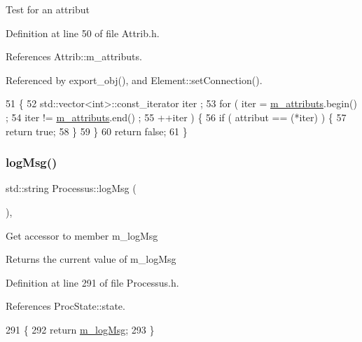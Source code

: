 Test for an attribut 

Definition at line 50 of file Attrib.\+h.



References Attrib\+::m\+\_\+attributs.



Referenced by export\+\_\+obj(), and Element\+::set\+Connection().


\begin{DoxyCode}
51   \{
52     std::vector<int>::const\_iterator iter ;
53     \textcolor{keywordflow}{for} ( iter  = \hyperlink{classAttrib_ac4bd58a0cc6b38a3b711d609a3d3aacc}{m\_attributs}.begin() ;
54           iter != \hyperlink{classAttrib_ac4bd58a0cc6b38a3b711d609a3d3aacc}{m\_attributs}.end()   ;
55           ++iter ) \{
56       \textcolor{keywordflow}{if} ( attribut == (*iter) ) \{
57         \textcolor{keywordflow}{return} \textcolor{keyword}{true};
58       \}
59     \}
60     \textcolor{keywordflow}{return} \textcolor{keyword}{false};
61   \}
\end{DoxyCode}
\mbox{\label{classProcessus_a42fdeb17dc13ba854222666b6aa29b61}} 
\subsubsection{\texorpdfstring{log\+Msg()}{logMsg()}}
{\footnotesize\ttfamily std\+::string Processus\+::log\+Msg (\begin{DoxyParamCaption}{ }\end{DoxyParamCaption})\hspace{0.3cm}{\ttfamily [inline]}, {\ttfamily [inherited]}}

Get accessor to member m\+\_\+log\+Msg \begin{DoxyReturn}{Returns}
the current value of m\+\_\+log\+Msg 
\end{DoxyReturn}


Definition at line 291 of file Processus.\+h.



References Proc\+State\+::state.


\begin{DoxyCode}
291                       \{
292     \textcolor{keywordflow}{return} \hyperlink{classProcessus_a3bc0140a3a69a83951ab7f9986bd2c84}{m\_logMsg};
293   \}
\end{DoxyCode}
\mbox{\label{classObject_a58b2d0618c2d08cf2383012611528d97}} 
